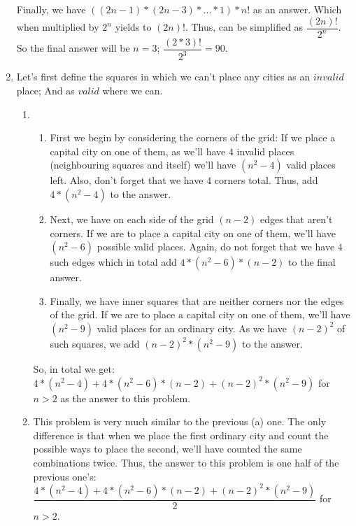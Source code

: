 \documentclass[12pt]{article}
\begin{document}
\begin{enumerate}
    \newline Finally, we have $((2n-1) * (2n - 3) * ... * 1) * n!$ as an answer. Which when multiplied by $2^n$ yields to $(2n)!$. Thus, can be simplified as $\dfrac{(2n)!}{2^n}$.
    \newline So the final answer will be $n = 3$; $\dfrac{(2*3)!}{2^3} = 90.$
  \item
    Let's first define the squares in which we can't place any cities as an $invalid$ place; And as $valid$ where we can.
    \begin{enumerate}
      \item
        \begin{enumerate}
          \item First we begin by considering the corners of the grid: \newline
            If we place a capital city on one of them, as we'll have $4$ invalid places (neighbouring squares and itself) we'll have $(n^2 - 4)$ valid places left. Also, don't forget that we have $4$ corners total. Thus, add $4 * (n^2 - 4)$ to the answer.
          \item Next, we have on each side of the grid $(n - 2)$ edges that aren't corners. If we are to place a capital city on one of them, we'll have $(n^2 - 6)$ possible valid places. Again, do not forget that we have $4$ such edges which in total add $4 * (n^2 - 6) * (n - 2)$ to the final answer.
          \item Finally, we have inner squares that are neither corners nor the edges of the grid. If we are to place a capital city on one of them, we'll have $(n^2 - 9)$ valid places for an ordinary city. As we have $(n-2)^2$ of such squares, we add $(n-2)^2 * (n^2-9)$ to the answer.
        \end{enumerate}
        So, in total we get: \newline
        $4*(n^2-4) + 4*(n^2 - 6)*(n-2) + (n - 2)^2 * (n^2-9)$ for $n > 2$
        \newline as the answer to this problem.
      \item This problem is very much similar to the previous (a) one. The only difference is that when we place the first ordinary city and count the possible ways to place the second, we'll have counted the same combinations twice. Thus, the answer to this problem is one half of the previous one's: \newline
        $\dfrac{4*(n^2-4) + 4*(n^2 - 6)*(n-2) + (n - 2)^2 * (n^2-9)}{2}$ \newline 
        for $n > 2$.
    \end{enumerate}
\end{enumerate}
\end{document}
